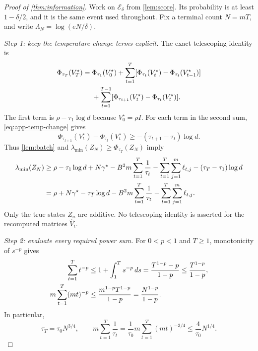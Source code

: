 \documentclass[10pt,twoside,letterpaper]{article}
\newcommand{\Vhat}{\widehat V}
\begin{document}
\begin{proof}[Proof of \cref{thm:information}]
Work on $\mathcal E_\delta$ from \cref{lem:score}. Its probability is
at least $1-\delta/2$, and it is the same event used throughout.
Fix a terminal count $N=mT$, and write $\Lambda_N=\log(eN/\delta)$.

\textit{Step 1: keep the temperature-change terms explicit.}
The exact telescoping identity is
\begin{align}
\Phi_{\tau_T}(V_T^\star)
={}&\Phi_{\tau_1}(V_0^\star)
 +\sum_{t=1}^T
 [\Phi_{\tau_t}(V_t^\star)-\Phi_{\tau_t}(V_{t-1}^\star)]\notag\\
&+\sum_{t=1}^{T-1}
 [\Phi_{\tau_{t+1}}(V_t^\star)-\Phi_{\tau_t}(V_t^\star)].
\label{eq:app-temperature-telescoping}
\end{align}
The first term is $\rho-\tau_1\log d$ because $V_0^\star=\rho I$.
For each term in the second sum, \eqref{eq:app-temp-change} gives
\begin{equation}
\Phi_{\tau_{t+1}}(V_t^\star)-\Phi_{\tau_t}(V_t^\star)
\ge-(\tau_{t+1}-\tau_t)\log d.
\label{eq:app-temperature-loss}
\end{equation}
Thus \cref{lem:batch} and
$\lambda_{\min}(Z_N)\ge\Phi_{\tau_T}(Z_N)$ imply
\begin{align}
\lambda_{\min}(Z_N)
&\ge\rho-\tau_1\log d+N\gamma^\star
 -B^2m\sum_{t=1}^T\frac1{\tau_t}
 -\sum_{t=1}^T\sum_{j=1}^m\ell_{t,j}
 -(\tau_T-\tau_1)\log d\notag\\
&=\rho+N\gamma^\star-\tau_T\log d
 -B^2m\sum_{t=1}^T\frac1{\tau_t}
 -\sum_{t=1}^T\sum_{j=1}^m\ell_{t,j}.
\label{eq:app-master-gap}
\end{align}
Only the true states $Z_n$ are additive. No telescoping identity is
asserted for the recomputed matrices $\Vhat_t$.

\textit{Step 2: evaluate every required power sum.}
For $0<p<1$ and $T\ge1$, monotonicity of $s^{-p}$ gives
\begin{align}
\sum_{t=1}^Tt^{-p}
&\le1+\int_1^T s^{-p}\,ds
=\frac{T^{1-p}-p}{1-p}
\le\frac{T^{1-p}}{1-p},\notag\\
m\sum_{t=1}^T(mt)^{-p}
&\le\frac{m^{1-p}T^{1-p}}{1-p}
=\frac{N^{1-p}}{1-p}.
\label{eq:app-power-sums}
\end{align}
In particular,
\begin{equation}
\tau_T=\tau_0N^{3/4},\qquad
m\sum_{t=1}^T\frac1{\tau_t}
=\frac1{\tau_0}m\sum_{t=1}^T(mt)^{-3/4}
\le\frac4{\tau_0}N^{1/4}.
\label{eq:app-temperature-sums}
\end{equation}


\end{proof}
\end{document}
